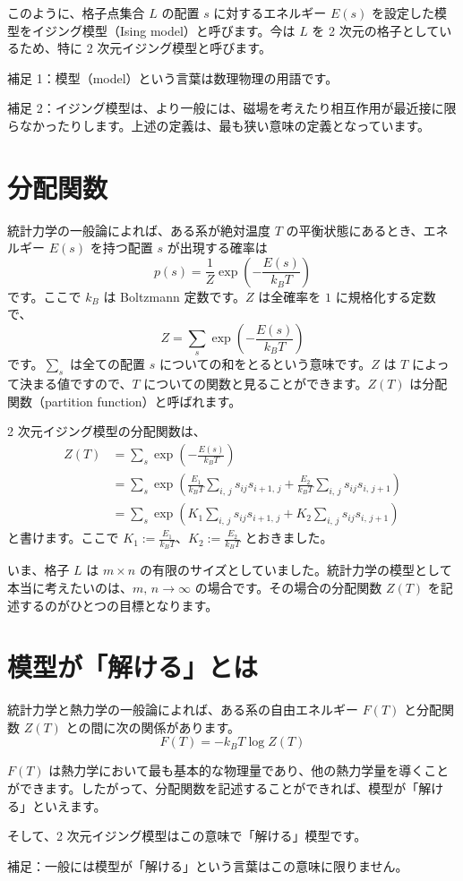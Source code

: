 \documentclass{jlreq}
\numberwithin{equation}{section}
\begin{document}
このように、格子点集合 $L$ の配置 $s$ に対するエネルギー $E(s)$ を設定した模型をイジング模型（Ising model）と呼びます。今は $L$ を 2 次元の格子としているため、特に 2 次元イジング模型と呼びます。

補足 1：模型（model）という言葉は数理物理の用語です。

補足 2：イジング模型は、より一般には、磁場を考えたり相互作用が最近接に限らなかったりします。上述の定義は、最も狭い意味の定義となっています。

\section*{分配関数}

統計力学の一般論によれば、ある系が絶対温度 $T$ の平衡状態にあるとき、エネルギー $E(s)$ を持つ配置 $s$ が出現する確率は
\begin{equation}
    p(s) = \frac{1}{Z} \exp \left( - \frac{E(s)}{k_B T} \right)
\end{equation}
です。ここで $k_B$ は Boltzmann 定数です。$Z$ は全確率を $1$ に規格化する定数で、
\begin{equation}
    Z = \sum_{s} \exp \left( - \frac{E(s)}{k_B T} \right)
\end{equation}
です。$\displaystyle \sum_{s}$ は全ての配置 $s$ についての和をとるという意味です。$Z$ は $T$ によって決まる値ですので、$T$ についての関数と見ることができます。$Z(T)$ は分配関数（partition function）と呼ばれます。

2 次元イジング模型の分配関数は、
\begin{equation}
    \begin{aligned}
        Z(T) & = \sum_{s} \exp \left( - \frac{E(s)}{k_B T} \right) \\
             & = \sum_{s} \exp \left(
        \frac{E_1}{k_B T} \sum_{i,\,j} s_{ij} s_{i+1,\,j} +
        \frac{E_2}{k_B T} \sum_{i,\,j} s_{ij} s_{i,\,j+1}
        \right)                                                    \\
             & = \sum_{s} \exp \left(
        K_1 \sum_{i,\,j} s_{ij} s_{i+1,\,j} +
        K_2 \sum_{i,\,j} s_{ij} s_{i,\,j+1}
        \right)
    \end{aligned}
\end{equation}
と書けます。ここで $K_1 := \frac{E_1}{k_B T}$、$K_2 := \frac{E_2}{k_B T}$ とおきました。

いま、格子 $L$ は $m \times n$ の有限のサイズとしていました。統計力学の模型として本当に考えたいのは、$m,\,n \to \infty$ の場合です。その場合の分配関数 $Z(T)$ を記述するのがひとつの目標となります。

\section*{模型が「解ける」とは}

統計力学と熱力学の一般論によれば、ある系の自由エネルギー $F(T)$ と分配関数 $Z(T)$ との間に次の関係があります。
\begin{equation}
    F(T) = - k_B T \log Z(T)
\end{equation}

$F(T)$ は熱力学において最も基本的な物理量であり、他の熱力学量を導くことができます。したがって、分配関数を記述することができれば、模型が「解ける」といえます。

そして、2 次元イジング模型はこの意味で「解ける」模型です。

補足：一般には模型が「解ける」という言葉はこの意味に限りません。
\end{document}

